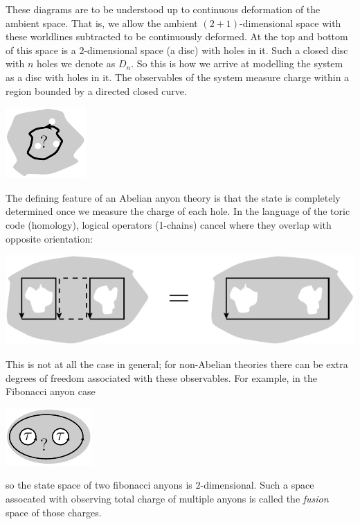 \documentclass[aps, prl, letterpaper, twocolumn, superscriptaddress, notitlepage, 10pt]{revtex4-1}
\begin{document}

These diagrams are to be understood up to
continuous deformation of the ambient space.
That is, we allow the ambient $(2+1)$-dimensional
space with these worldlines subtracted to be continuously
deformed.
At the top and bottom of this space is 
a $2$-dimensional space (a disc) with holes in it.
Such a closed disc with $n$ holes we denote as $D_n.$
So this is how we arrive at modelling the system as
a disc with holes in it.
The observables of the system measure charge within
a region bounded by a directed closed curve.
\begin{center}
\includegraphics[]{pic-observable.pdf}
\end{center}

The defining feature of an Abelian anyon theory
is that the state is completely determined once
we measure the charge of each hole.
In the language of the toric code (homology),
logical operators (1-chains)
cancel where they overlap
with opposite orientation:
\begin{center}
\includegraphics[width=0.7\columnwidth]{pic-abelian.pdf}
\end{center}

This is not at all the case in general;
for non-Abelian theories there can be extra
degrees of freedom associated with these
observables. For example, in
the Fibonacci anyon case
\begin{center}
\includegraphics[]{pic-fusion.pdf}
\end{center}
so the state space of two fibonacci anyons
is $2$-dimensional.
Such a space assocated with observing total charge
of multiple anyons is called the \emph{fusion} space
of those charges.
\end{document}
